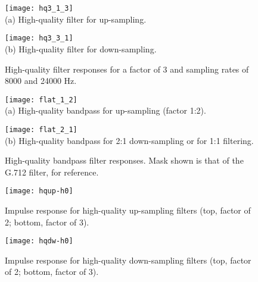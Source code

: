 \begin{figure}[hbtp]
  \begin{center}
        \texttt{[image: hq3\_1\_3]}
    \\
   (a) High-quality filter for up-sampling.

        \texttt{[image: hq3\_3\_1]}
   \\
   (b) High-quality filter for down-sampling.

  \end{center}
  \caption{\SF High-quality filter responses for a
               factor of 3 and sampling rates of 8000 and
               24000 Hz.\label{hq-frq-1-3}}

\end{figure}


\begin{figure}[hbtp]
  \begin{center}
 \texttt{[image: flat\_1\_2]}
 \\
   (a) High-quality bandpass for up-sampling (factor 1:2).

 \texttt{[image: flat\_2\_1]}
 \\
   (b) High-quality bandpass for 2:1 down-sampling or for 1:1
       filtering.

  \end{center}
  \caption{\SF High-quality bandpass filter responses. Mask shown is
           that of the G.712 filter, for reference.
           \label{hq-bandpass}
          }
\end{figure}


\begin{figure}[hbtp]
  \begin{center}
 \texttt{[image: hqup-h0]}
  \end{center}
  \caption{\SF Impulse response for high-quality
               up-sampling filters (top, factor of 2; bottom,
               factor of 3).\label{ir-hq-up}}
\end{figure}


\begin{figure}[hbtp]
  \begin{center}
 \texttt{[image: hqdw-h0]}
  \end{center}
  \caption{\SF Impulse response for high-quality
               down-sampling filters (top, factor of 2;
               bottom, factor of 3).\label{ir-hq-down}}
\end{figure}


